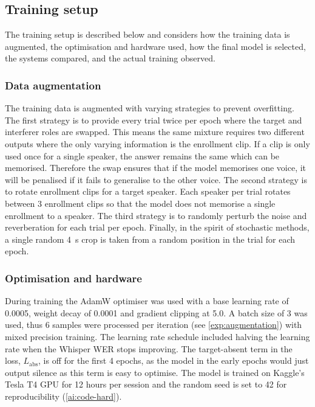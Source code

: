   \subsection{Training setup}
  \label{sec:training}
  The training setup is described below and considers how the training data is augmented, the optimisation and hardware used, how the final model is selected, the systems compared, and the actual training observed.
  \subsubsection{Data augmentation}
  \label{exp:augmentation}
  The training data is augmented with varying strategies to prevent overfitting. The first strategy is to provide every trial twice per epoch where the target and interferer roles are swapped. This means the same mixture requires two different outputs where the only varying information is the enrollment clip. If a clip is only used once for a single speaker, the answer remains the same which can be memorised. Therefore the swap ensures that if the model memorises one voice, it will be penalised if it fails to generalise to the other voice. The second strategy is to rotate enrollment clips for a target speaker. Each speaker per trial rotates between 3 enrollment clips so that the model does not memorise a single enrollment to a speaker. The third strategy is to randomly perturb the noise and reverberation for each trial per epoch. Finally, in the spirit of stochastic methods, a single random \SI{4}{\second} crop is taken from a random position in the trial for each epoch.

  \subsubsection{Optimisation and hardware}
  \label{exp:hyperparam}
  During training the AdamW optimiser \cite{loshchilov2019adamw} was used with a base learning rate of \num{0.0005}, weight decay of \num{0.0001} and gradient clipping at \num{5.0}. A batch size of 3 was used, thus 6 samples were processed per iteration (see \autoref{exp:augmentation}) with mixed precision training. The learning rate schedule included halving the learning rate when the Whisper WER stops improving. The target-absent term in the loss, $L_{\text{abs}}$, is off for the first 4 epochs, as the model in the early epochs would just output silence as this term is easy to optimise. The model is trained on Kaggle's Tesla T4 GPU for 12 hours per session and the random seed is set to 42 for reproducibility (\ref{ai:code-hard}). 
 

